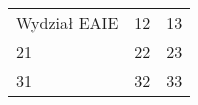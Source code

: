 \documentclass[11pt]{article}
\begin{document}
\begin{tabular}{lll}
	Wydział  EAIE  & 12 & 13\\
	21 & 22 & 23\\
	31 & 32 & 33\\
\end{tabular}
\end{document}
